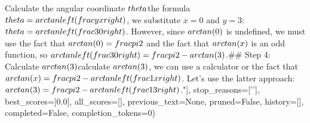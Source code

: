 Calculate the angular coordinate $\\theta$\nUsing the formula $\\theta = \\arctan\\left(\\frac{y}{x}\\right)$, we substitute $x = 0$ and $y = 3$:\n$\\theta = \\arctan\\left(\\frac{3}{0}\\right)$. However, since $\\arctan(0)$ is undefined, we must use the fact that $\\arctan(0) = \\frac{\\pi}{2}$ and the fact that $\\arctan(x)$ is an odd function, so $\\arctan\\left(\\frac{3}{0}\\right) = \\frac{\\pi}{2} - \\arctan(3)$.\n\n## Step 4: Calculate $\\arctan(3)$\nTo calculate $\\arctan(3)$, we can use a calculator or the fact that $\\arctan(x) = \\frac{\\pi}{2} - \\arctan\\left(\\frac{1}{x}\\right)$. Let's use the latter approach:\n$\\arctan(3) = \\frac{\\pi}{2} - \\arctan\\left(\\frac{1}{3}\\right)$.\n\n"], stop_reasons=['\n\n'], best_scores=[0.0], all_scores=[], previous_text=None, pruned=False, history=[], completed=False, completion_tokens=0)


